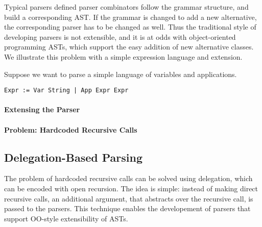 
Typical parsers defined parser combinators follow the grammar
structure, and build a corresponding AST. If the grammar is changed to
add a new alternative, the corresponding parser has to be changed as
well. Thus the traditional style of developing parsers is not
extensible, and it is at odds with object-oriented programming ASTs,
which support the easy addition of new alternative classes. We
illustrate this problem with a simple expression language and extension.

Suppose we want to parse a simple language of variables and
applications.

\begin{lstlisting}[language=PlainCode]
Expr := Var String | App Expr Expr
\end{lstlisting}

\paragraph{Extensing the Parser}

\paragraph{Problem: Hardcoded Recursive Calls} 

\subsection{Delegation-Based Parsing}\label{subsec:overview-firstlook}

The problem of hardcoded recursive calls can be solved using
delegation, which can be encoded with open recursion. The idea is
simple: instead of making direct recursive calls, an additional
argument, that abstracts over the recursive call, is passed to the 
parsers. This technique enables the developement of parsers that 
support OO-style extensibility of ASTs. 

